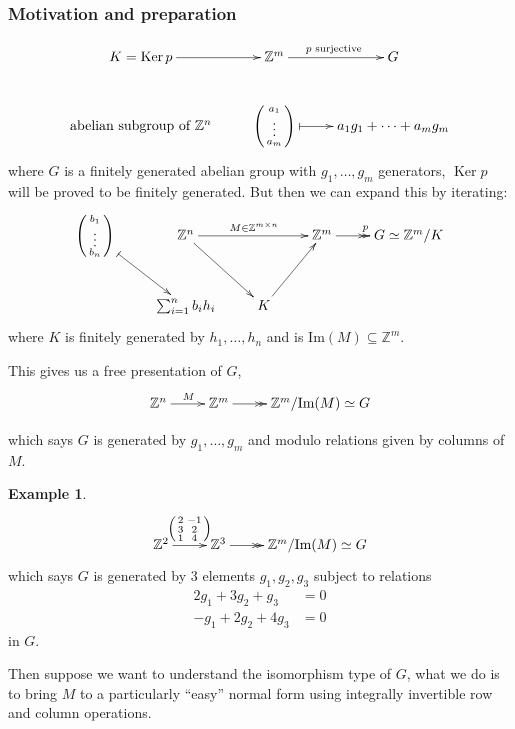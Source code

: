 \documentclass[a4paper]{article}
\newcommand{\Ker}{\operatorname{Ker}}
\theoremstyle{definition}
\newtheorem{example}[defn]{Example}
\begin{document}
\subsubsection{Motivation and preparation}
\[
\xymatrix{
K=\Ker p \ar[r] & \mathbb Z^m\ar[r]^{p\text{ surjective} } & G \\
{\text{abelian subgroup of }\mathbb Z^n} & {\begin{psmallmatrix}
     a_1 \\ \vdots \\ a_m
 \end{psmallmatrix}}\ar@{|-{>}}[r]& a_1 g_1 +\cdots+a_m g_m
}
\]
where $G$ is a finitely generated abelian group with $g_1,\ldots,g_m$ generators, $\Ker p$ will be proved to be finitely generated. But then we can expand this by iterating:
\[
\xymatrix{
{\begin{psmallmatrix}
     b_1 \\ \vdots \\ b_n
 \end{psmallmatrix}} \ar@{|-{>}}[dr] & \mathbb Z^n \ar[dr] \ar[rr]^{ M \in \mathbb Z^{m\times n}} & & \mathbb Z^m \ar@{-{>>}}[r]^p & G \simeq \mathbb Z^m / K \\
& {\sum_{i=1}^n b_i h_i} & K \ar[ur]
}
\]
where $K$ is finitely generated by $h_1,\ldots,h_n$ and is $\text{Im}(M) \subseteq \mathbb Z^m$.

This gives us a free presentation of $G$, 
\[
\xymatrix{
\mathbb Z^n \ar[r]^{M} & \mathbb Z^m\ar@{-{>>}}[r] & {\mathbb Z^m / \text{Im}( M)} \simeq G
}
\]

which says $G$ is generated by $g_1,\ldots,g_m$ and modulo relations given by columns of $M$.
\begin{example}
\[
\xymatrix{
\mathbb Z^2 \ar[r]^{\begin{psmallmatrix}
    2 & -1 \\ 3 & 2 \\ 1 & 4
\end{psmallmatrix}} & \mathbb Z^3 \ar@{-{>>}}[r] & \mathbb Z^m/\text{Im}( M) \simeq G
}
\]
which says $G$ is generated by 3 elements $g_1,g_2,g_3$ subject to relations
\[
\begin{aligned}
2g_1+3g_2+g_3 &= 0 \\
-g_1+2g_2+4g_3 &= 0
\end{aligned}
\]
in $G$.
\end{example}
Then suppose we want to understand the isomorphism type of $G$, what we do is to bring $ M$ to a particularly ``easy'' normal form using integrally invertible row and column operations.
\end{document}
